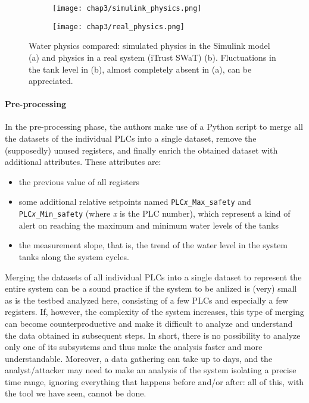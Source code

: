 \pagebreak
\begin{figure}[ht]
	\centering
	\begin{subfigure}{0.9\textwidth}
		\texttt{[image: chap3/simulink\_physics.png]}
		\caption{}
		\label{subfig:simulink_physics}
	\end{subfigure}
	\hfill
	\begin{subfigure}{0.9\textwidth}
		\texttt{[image: chap3/real\_physics.png]}
		\caption{}
		\label{subfig:real_physics}
	\end{subfigure}
	\caption{Water physics compared: simulated physics in the Simulink model (a) and physics in a real system (iTrust SWaT) (b). Fluctuations in the tank level in (b), almost completely absent in (a), can be appreciated.}
	\label{fig:testbed_physics}
\end{figure}

\paragraph{Pre-processing}
In the pre-processing phase, the authors make use of a Python script to merge all the datasets of the individual PLCs into a single dataset, remove the (supposedly) unused registers, and finally enrich the obtained dataset with additional attributes. These attributes are:

\begin{itemize}
	\item the previous value of all registers
	
	\item some additional relative setpoints named \texttt{PLC\textit{x}\_Max\_safety} and\\ 
	\texttt{PLC\textit{x}\_Min\_safety} (where \textit{x} is the PLC number), which represent a kind of alert on reaching the maximum and minimum water levels of the tanks
	
	\item the measurement slope, that is, the trend of the water level in the system tanks along the system cycles.	
\end{itemize}

Merging the datasets of all individual PLCs into a single dataset to represent the entire system can be a sound practice if the system to be anlized is (very) small as is the testbed analyzed here, consisting of a few PLCs and especially a few registers. If, however, the complexity of the system increases, this type of merging can become counterproductive and make it difficult to analyze and understand the data obtained in subsequent steps. In short, there is no possibility to analyze only one of its subsystems and thus make the analysis faster and more understandable. Moreover, a data gathering can take up to days, and the analyst/attacker may need to make an analysis of the system isolating a precise time range, ignoring everything that happens before and/or after: all of this, with the tool we have seen, cannot be done.

